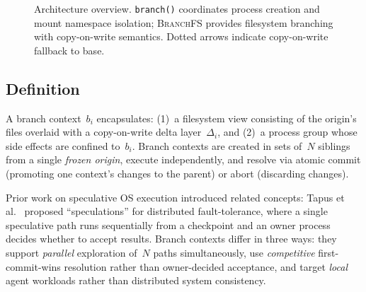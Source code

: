 \documentclass[sigconf]{acmart}
\newcommand{\sys}{\textsc{BranchFS}\xspace}
\newcommand{\syscall}{\texttt{branch()}\xspace}
\begin{document}
\begin{figure}[t]
	\caption{Architecture overview. \syscall coordinates process creation and mount namespace isolation; \sys provides filesystem branching with copy-on-write semantics. Dotted arrows indicate copy-on-write fallback to base.}
	\label{fig:architecture}
\end{figure}

\subsection{Definition}

A branch context~$b_i$ encapsulates: (1)~a filesystem view consisting of the origin's files overlaid with a copy-on-write delta layer~$\Delta_i$, and (2)~a process group whose side effects are confined to~$b_i$. Branch contexts are created in sets of~$N$ siblings from a single \emph{frozen origin}, execute independently, and resolve via atomic commit (promoting one context's changes to the parent) or abort (discarding changes).

Prior work on speculative OS execution introduced related concepts: Tapus et al.~\cite{tapus} proposed ``speculations'' for distributed fault-tolerance, where a single speculative path runs sequentially from a checkpoint and an owner process decides whether to accept results. Branch contexts differ in three ways: they support \emph{parallel} exploration of~$N$ paths simultaneously, use \emph{competitive} first-commit-wins resolution rather than owner-decided acceptance, and target \emph{local} agent workloads rather than distributed system consistency.
\end{document}
